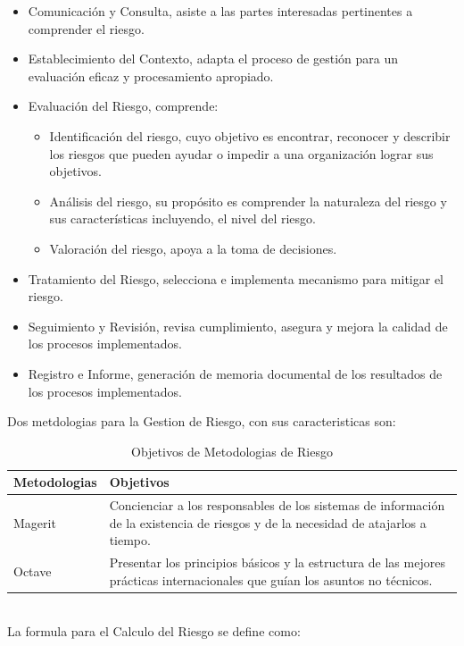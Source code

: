 \documentclass[a4paper,12pt]{article}
\begin{document}
\begin{itemize} 
\item Comunicación y Consulta, asiste a las partes interesadas pertinentes a comprender el 
riesgo. 
\item Establecimiento del Contexto, adapta el proceso de gestión para un evaluación 
eficaz y procesamiento apropiado. 
\item Evaluación del Riesgo, comprende:
\begin{itemize}
\item Identificación del riesgo, cuyo objetivo es encontrar, reconocer y describir los 
riesgos que pueden ayudar o impedir a una organización lograr sus objetivos. 
\item Análisis del riesgo, su propósito es comprender la naturaleza del riesgo y sus 
características incluyendo, el nivel del riesgo. 
\item Valoración del riesgo, apoya a la toma de decisiones.
\end{itemize} 
\item Tratamiento del Riesgo, selecciona e implementa mecanismo para mitigar el riesgo. 
\item Seguimiento y Revisión, revisa cumplimiento, asegura y mejora la calidad de los 
procesos implementados. 
\item Registro e Informe, generación de memoria documental de los resultados de los 
procesos implementados.\\
\end{itemize}
Dos metdologias para la Gestion de Riesgo, con sus caracteristicas son:
\break
\begin{table}[h]
  \begin{center}
      \begin{tabular}{ | m{3cm} | m{10cm} | }
          \hline Metodologias & Objetivos \\ \hline
             Magerit & Concienciar a los responsables de los sistemas de información de la existencia de riesgos y de la necesidad de atajarlos a tiempo. \\ \hline
             Octave & Presentar los principios básicos y la estructura de las mejores prácticas internacionales que guían los asuntos no técnicos. \\ \hline
      \end{tabular}
      \caption{Objetivos de Metodologias de Riesgo}
   \end{center}
\end{table}\\
La formula para el Calculo del Riesgo se define como: \\ 
\end{document}
